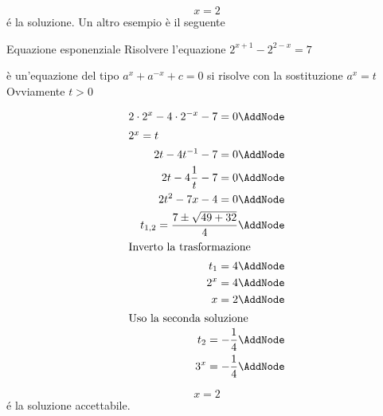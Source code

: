 	\[x=2\]
	\'{e} la soluzione.
Un altro esempio è il seguente
\begin{esempiot}{Equazione esponenziale}{}
	Risolvere l'equazione $ 2^{x+1}-2^{2-x}=7$ 
\end{esempiot}
	è un'equazione del tipo $a^{x}+a^{-x}+c=0$ si risolve con la sostituzione $a^{x}=t$
	Ovviamente $t>0$ 
	\begin{NodesList}%
		\begin{align*}
			 2\cdot 2^{x}-4\cdot 2^{-x}-7=0\AddNode\\
			 \intertext{\hfil $2^x=t$}
			2t-4t^{-1}-7=0\AddNode\\
			2t-4\dfrac{1}{t}-7=0\AddNode\\
			2t^2-7x-4=0\AddNode\\
			t_{1,2}=\dfrac{7\pm\sqrt{49+32}}{4}\AddNode\\
			\intertext{\hfil Inverto la trasformazione}
			t_{1}=4\AddNode\\
			2^{x}=4\AddNode\\
			x=2\AddNode\\
			\intertext{\hfil Uso la seconda soluzione}
			t_{2}=-\dfrac{1}{4} \AddNode\\
			3^x=-\dfrac{1}{4}\AddNode
		\end{align*}
		\LinkNodes{}%
	\end{NodesList}
	\[x=2\]
	\'{e} la soluzione accettabile.
